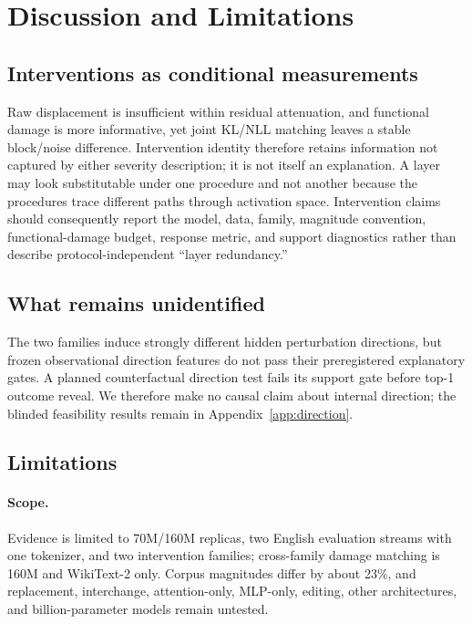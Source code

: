 \section{Discussion and Limitations}

\subsection{Interventions as conditional measurements}

Raw displacement is insufficient within residual attenuation, and functional
damage is more informative, yet joint KL/NLL matching leaves a stable
block/noise difference. Intervention identity therefore retains information
not captured by either severity description; it is not itself an explanation.
A layer may look substitutable under one procedure and not another because the
procedures trace different paths through activation space. Intervention claims
should consequently report the model, data, family, magnitude convention,
functional-damage budget, response metric, and support diagnostics rather than
describe protocol-independent ``layer redundancy.''

\subsection{What remains unidentified}

The two families induce strongly different hidden perturbation directions, but
frozen observational direction features do not pass their preregistered
explanatory gates. A planned counterfactual direction test fails its support
gate before top-1 outcome reveal. We therefore make no causal claim about
internal direction; the blinded feasibility results remain in
Appendix~\ref{app:direction}.

\subsection{Limitations}

\paragraph{Scope.}
Evidence is limited to 70M/160M \model{} replicas, two English evaluation
streams with one tokenizer, and two intervention families; cross-family damage
matching is 160M and WikiText-2 only. Corpus magnitudes differ by about 23\%,
and replacement, interchange, attention-only, MLP-only, editing, other
architectures, and billion-parameter models remain untested.

